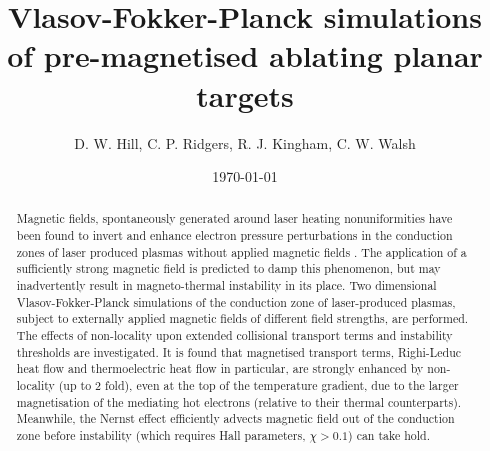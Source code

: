 \documentclass[aip,reprint]{revtex4-1}
\begin{document}

\title{Vlasov-Fokker-Planck simulations of pre-magnetised ablating planar targets} %



\author{D. W. Hill, C. P. Ridgers, R. J. Kingham, C. W. Walsh}



\date{\today}

\begin{abstract}
	Magnetic fields, spontaneously generated around  laser heating nonuniformities have been found to invert and enhance electron pressure perturbations in the conduction zones of laser produced plasmas without applied magnetic fields \cite{Hill2018}. The application of a sufficiently strong magnetic field is predicted to damp this phenomenon, but may inadvertently result in magneto-thermal instability in its place. Two dimensional Vlasov-Fokker-Planck simulations of the conduction zone of laser-produced plasmas, subject to externally applied magnetic fields  of different field strengths, are performed. The effects of non-locality upon extended collisional transport terms and instability thresholds are investigated. It is found that magnetised transport terms, Righi-Leduc heat flow and thermoelectric heat flow in particular, are strongly enhanced by non-locality (up to 2 fold), even at the top of the temperature gradient, due to the larger magnetisation of the mediating hot electrons (relative to their thermal counterparts). Meanwhile, the Nernst effect efficiently advects magnetic field out of the conduction zone before instability (which requires Hall parameters, $\chi >0.1$) can take hold. 
\end{abstract}
% 
\end{document}
